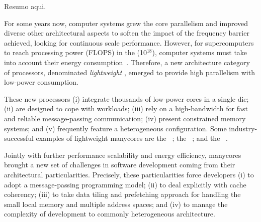 \begin{resumo}[brazil]
Resumo aqui.
\end{resumo}

\begin{resumo}[english]
    For some years now, computer systems grew the core parallelism and improved diverse other architectural aspects to soften the impact of the frequency barrier achieved, looking for continuous scale performance.
    However, for supercomputers to reach processing power (FLOPS) in the \exascale (10$^{18}$), computer systems must take into account their energy consumption~\cite{darpa:exascale}. Therefore, a new architecture category of processors, denominated \textit{lightweight} \manycores, emerged to provide high parallelism with low-power consumption.

    These new processors
    (i) integrate thousands of low-power cores in a single die; 
    (ii) are designed to cope with \mimd workloads;
    (iii) rely on a high-bandwidth \noc for fast and reliable message-passing communication;
    (iv) present constrained memory systems; and
    (v) frequently feature a heterogeneous configuration.
    Some industry-successful examples of lightweight manycores are
    the \mppa~\cite{DeDinechin2013-1};
    the \epiphany~\cite{Olofsson2014}; and
    the \taihulight~\cite{Zheng2015}.

    Jointly with further performance scalability and energy efficiency, manycores brought a new set of challenges in software development coming from their architectural particularities.
    Precisely, these particularities force developers 
    (i) to adopt a message-passing programming model; 
    (ii) to deal explicitly with cache coherency;
    (iii) to take data tiling and prefetching approach for handling the small local memory and multiple address spaces; and
    (iv) to manage the complexity of development to commonly heterogeneous architecture.
    


\end{resumo}